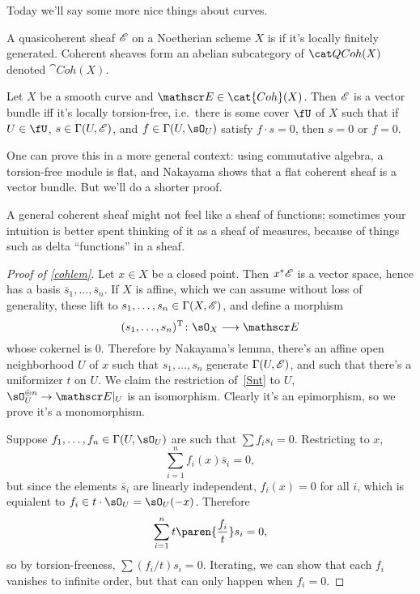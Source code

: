 Today we'll say some more nice things about curves.
\begin{defn}
A quasicoherent sheaf $\mathscr E$ on a Noetherian scheme $X$ is  if it's locally finitely generated.
Coherent sheaves form an abelian subcategory of $\QCoh(X)$ denoted $\cat{Coh}(X)$.
\end{defn}
\begin{lem}
\label{cohlem}
Let $X$ be a smooth curve and $\sE\in\cat{Coh}(X)$. Then $\mathscr E$ is a vector bundle iff it's locally torsion-free,
i.e.\ there is some cover $\fU$ of $X$ such that if $U\in\fU$, $s\in\Gamma(U, \mathscr E)$, and $f\in\Gamma(U, \sO_U)$
satisfy $f\cdot s = 0$, then $s= 0$ or $f = 0$.
\end{lem}
\begin{rem}
One can prove this in a more general context: using commutative algebra, a torsion-free module is flat, and
Nakayama shows that a flat coherent sheaf is a vector bundle. But we'll do a shorter proof.

A general coherent sheaf might not feel like a sheaf of functions; sometimes your intuition is better spent
thinking of it as a sheaf of measures, because of things such as delta ``functions'' in a sheaf.
\end{rem}
\begin{proof}[Proof of \cref{cohlem}]
Let $x\in X$ be a closed point. Then $x^*\mathscr E$ is a vector space, hence has a basis $\overline s_1,\dotsc,\overline
s_n$. If $X$ is affine, which we can assume without loss of generality, these lift to
$s_1,\dotsc,s_n\in\Gamma(X,\mathscr E)$, and define a morphism
\begin{equation}
\label{Snt}
	(s_1,\dotsc,s_n)^{\mathrm T}\colon\sO_X\longrightarrow\sE
\end{equation}
whose cokernel is $0$. Therefore by Nakayama's lemma, there's an affine open neighborhood $U$ of $x$ such that
$s_1,\dotsc,s_n$ generate $\Gamma(U,\mathscr E)$, and such that there's a uniformizer $t$ on $U$. We claim the restriction
of~\eqref{Snt} to $U$, $\sO_U^{\oplus n}\to\sE|_U$ is an isomorphism. Clearly it's an epimorphism, so we prove it's
a monomorphism.

Suppose $f_1,\dotsc,f_n\in\Gamma(U, \sO_U)$ are such that $\sum f_is_i = 0$. Restricting to $x$,
\begin{equation}
	\sum_{i=1}^n f_i(x)\overline s_i = 0,
\end{equation}
but since the elements $\overline s_i$ are linearly independent, $f_i(x) = 0$ for all $i$, which is equialent to
$f_i\in t\cdot \sO_U = \sO_U(-x)$. Therefore
\begin{equation}
	\sum_{i=1}^n t\paren{\frac{f_i}{t}}s_i = 0,
\end{equation}
so by torsion-freeness, $\sum (f_i/t)s_i = 0$. Iterating, we can show that each $f_i$ vanishes to infinite order,
but that can only happen when $f_i = 0$.
\end{proof}
